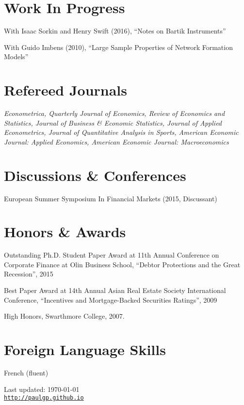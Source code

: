 \documentclass[letterpaper]{article}
\renewenvironment{itemize}{
  \begin{list}{}
    { \setlength{\itemsep}{5pt}
      \setlength{\parsep}{0pt}
      \setlength{\topsep}{0pt}
      \setlength{\leftmargin}{0em} } }{
  \end{list}}
\begin{document}
\section*{Work In Progress}
\begin{itemize}
\item With Isaac Sorkin and Henry Swift (2016), ``Notes on Bartik Instruments''
\item With Guido Imbens (2010), ``Large Sample Properties of Network  Formation Models''
\end{itemize}


\section*{Refereed Journals}
\textit{Econometrica, Quarterly Journal of Economics, Review of Economics and Statistics, Journal of Business \& Economic Statistics, Journal of Applied Econometrics, Journal of Quantitative Analysis in Sports, American Economic Journal: Applied Economics, American Economic Journal: Macroeconomics}

\section*{Discussions \& Conferences}
European Summer Symposium In Financial Markets (2015, Discussant)

\section*{Honors \& Awards}

\begin{itemize}
\item Outstanding Ph.D. Student Paper Award at 11th Annual Conference
  on Corporate Finance at Olin Business School, ``Debtor Protections
  and the Great Recession'', 2015
\item Best Paper Award at 14th Annual Asian Real Estate Society
  International Conference, ``Incentives and Mortgage-Backed
  Securities Ratings'', 2009
\item High Honors, Swarthmore College, 2007.
\end{itemize}

\section*{Foreign Language Skills}

\begin{itemize}
\item French (fluent)
\end{itemize}
\bigskip

\begin{center}
\begin{footnotesize}
Last updated: \today \\
\href{http://paulgp.github.io}{\tt http://paulgp.github.io}
\end{footnotesize}
\end{center}
\end{document}
